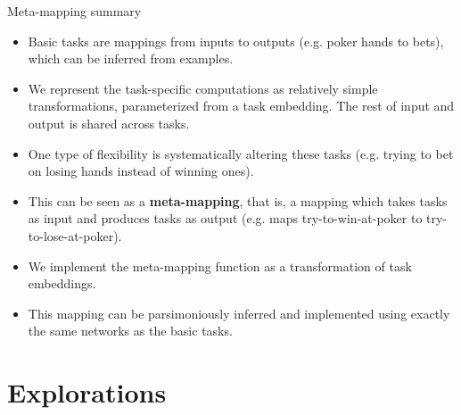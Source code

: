 \documentclass{beamer}
\begin{document}
\begin{frame}{Meta-mapping summary}
\begin{itemize}
\item Basic tasks are mappings from inputs to outputs (e.g. poker hands to bets), which can be inferred from examples.
\item We represent the task-specific computations as relatively simple transformations, parameterized from a task embedding. The rest of input and output is shared across tasks.
\item One type of flexibility is systematically altering these tasks (e.g. trying to bet on losing hands instead of winning ones).
\item This can be seen as a \textbf{meta-mapping}, that is, a mapping which takes tasks as input and produces tasks as output (e.g. maps try-to-win-at-poker to try-to-lose-at-poker).
\item We implement the meta-mapping function as a transformation of task embeddings.
\item This mapping can be parsimoniously inferred and implemented using exactly the same networks as the basic tasks.
\end{itemize}
\end{frame}

\section{Explorations}

%
\end{document}
